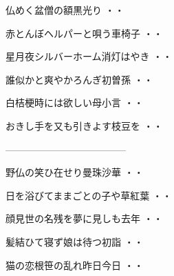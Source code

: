 \begin{shiika}仏めく盆僧の額黒光り
\hfill{・・}\end{shiika}
\vspace{0.6cm}
\begin{shiika}赤とんぼヘルパーと唄う車椅子
\hfill{・・}\end{shiika}
\vspace{0.6cm}
\begin{shiika}星月夜シルバーホーム消灯はやき
\hfill{・・}\end{shiika}
\vspace{0.6cm}
\begin{shiika}誰似かと爽やかろんぎ初曽孫
\hfill{・・}\end{shiika}
\vspace{0.6cm}
\begin{shiika}白桔梗時には欲しい母小言
\hfill{・・}\end{shiika}
\vspace{0.6cm}
\begin{shiika}おきし手を又も引きよす枝豆を
\hfill{・・}\end{shiika}
--------------------------------------
\vspace{0.6cm}
\begin{shiika}野仏の笑ひ在せり曼珠沙華
\hfill{・・}\end{shiika}
\vspace{0.6cm}
\begin{shiika}日を浴びてままごとの子や草紅葉
\hfill{・・}\end{shiika}
\vspace{0.6cm}
\begin{shiika}顔見世の名残を夢に見しも去年
\hfill{・・}\end{shiika}
\vspace{0.6cm}
\begin{shiika}髪結ひて寝ず娘は待つ初詣
\hfill{・・}\end{shiika}
\vspace{0.6cm}
\begin{shiika}猫の恋根笹の乱れ昨日今日
\hfill{・・}\end{shiika}
\vspace{0.6cm}
